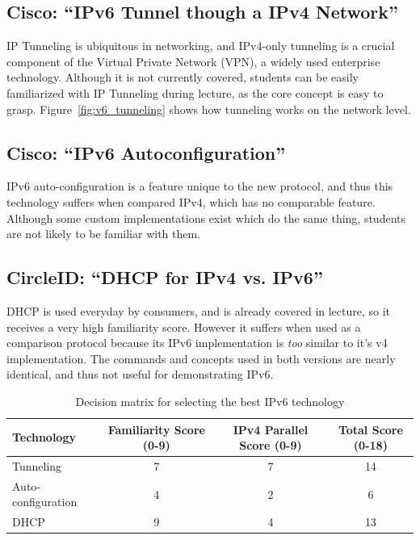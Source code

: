 \documentclass[12pt]{article}
\begin{document}
\subsection{Cisco: ``IPv6 Tunnel though a IPv4 Network''}
IP Tunneling is ubiquitous in networking, and IPv4-only tunneling is a crucial component of the Virtual Private Network (VPN), a widely used enterprise technology. Although it is not currently covered, students can be easily familiarized with IP Tunneling during lecture, as the core concept is easy to grasp. Figure~\ref{fig:v6_tunneling} shows how tunneling works on the network level.

\subsection{Cisco: ``IPv6 Autoconfiguration''}
IPv6 auto-configuration is a feature unique to the new protocol, and thus this technology suffers when compared IPv4, which has no comparable feature. Although some custom implementations exist which do the same thing, students are not likely to be familiar with them.

\subsection{CircleID: ``DHCP for IPv4 vs. IPv6''}
DHCP is used everyday by consumers, and is already covered in lecture, so it receives a very high familiarity score. However it suffers when used as a comparison protocol because its IPv6 implementation is \textit{too} similar to it's v4 implementation. The commands and concepts used in both versions are nearly identical, and thus not useful for demonstrating IPv6.

\medskip
\begin{table}[h!]
  \centering
  \label{table:dec_matrix}
  \begin{tabulary}{\textwidth}{|L|C|C|C|}
    \hline
    Technology & Familiarity Score (0-9) & IPv4 Parallel Score (0-9) & Total Score (0-18) \\ \hline\hline
    Tunneling          & 7 & 7 & 14 \\ \hline
    Auto-configuration & 4 & 2 & 6 \\ \hline
    DHCP               & 9 & 4 & 13 \\ \hline
    \hline
  \end{tabulary}
  \caption{Decision matrix for selecting the best IPv6 technology}
\end{table}
\end{document}
